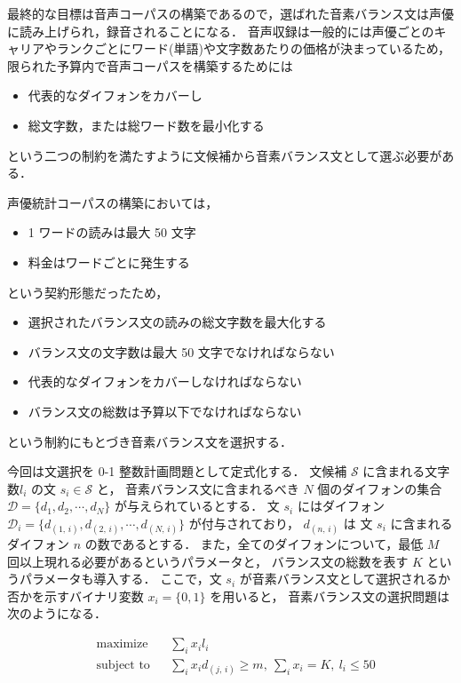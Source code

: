 \documentclass[final,10pt,twocolumn,3p,times,fleqn]{elsarticle}
\begin{document}
  最終的な目標は音声コーパスの構築であるので，選ばれた音素バランス文は声優に読み上げられ，録音されることになる．
  音声収録は一般的には声優ごとのキャリアやランクごとにワード(単語)や文字数あたりの価格が決まっているため，
  限られた予算内で音声コーパスを構築するためには
  \begin{itemize}
   \item 代表的なダイフォンをカバーし
   \item 総文字数，または総ワード数を最小化する
  \end{itemize}
  という二つの制約を満たすように文候補から音素バランス文として選ぶ必要がある．

  声優統計コーパスの構築においては，
  \begin{itemize}
   \item 1 ワードの読みは最大 50 文字
   \item 料金はワードごとに発生する
  \end{itemize}
  という契約形態だったため，

  \begin{itemize}
   \item 選択されたバランス文の読みの総文字数を最大化する
   \item バランス文の文字数は最大 50 文字でなければならない
   \item 代表的なダイフォンをカバーしなければならない
   \item バランス文の総数は予算以下でなければならない
  \end{itemize}

  という制約にもとづき音素バランス文を選択する．
  
  今回は文選択を 0-1 整数計画問題として定式化する．
  文候補 $\mathcal{S}$ に含まれる文字数$l_i$ の文 $s_i \in \mathcal{S}$ と，
  音素バランス文に含まれるべき $N$ 個のダイフォンの集合 $\mathcal{D} = \{d_1, d_2, \cdots, d_N\}$ が与えられているとする．
  文 $s_i$ にはダイフォン $\mathcal{D}_i = \{d_{(1,\, i)}, d_{(2,\, i)}, \cdots, d_{(N,\, i)}\}$ が付与されており，
  $d_{(n,\, i)}$ は 文 $s_i$ に含まれるダイフォン $n$ の数であるとする．
  また，全てのダイフォンについて，最低 $M$ 回以上現れる必要があるというパラメータと，
  バランス文の総数を表す $K$  というパラメータも導入する．
  ここで，文 $s_i$ が音素バランス文として選択されるか否かを示すバイナリ変数 $x_{i} = \{0, 1\}$ を用いると，
  音素バランス文の選択問題は次のようになる．

\begin{equation*}
\begin{aligned}
& \text{maximize} & & \sum_i x_i l_i \\
 & \text{subject to} & & \sum_i x_i d_{(j,\, i)} \geq m,\  \sum_i x_i = K, \  l_i \leq 50
\end{aligned}
\end{equation*}
\end{document}
